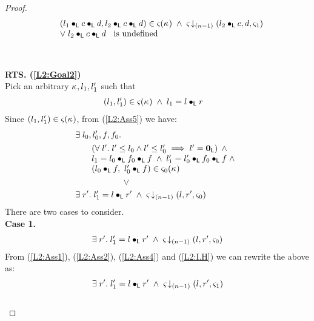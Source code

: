 \begin{lemma}[]
\begin{proof}
%
\begin{align}
	\begin{array}{l l}
		&(l_1 \bullet_{\textsf{L}} c \bullet_{\textsf{L}} d, l_2 \bullet_{\textsf{L}} c \bullet_{\textsf{L}} d) \in \varsigma_{}(\kappa_{})\;\land\;  \varsigma_{} \!\downarrow_{(n-1)} \left(l_2 \bullet_{\textsf{L}} c, d, \varsigma_{1}\right) \\
		& \lor\; l_2 \bullet_{\textsf{L}} c \bullet_{\textsf{L}} d \hspace*{0.2cm}\text{ is undefined}
	\end{array} \label{L2:DismissedGoal4}
\end{align}\\\\
%
%
%
%
%
\noindent\textbf{RTS. (\ref{L2:Goal2})}\\
Pick an arbitrary $\kappa_{}, l_1, l'_1$ such that
\begin{align}
	&(l_1, l'_1) \in \varsigma_{}(\kappa_{}) \;\land\; l_1 = l \bullet_{\textsf{L}} r \label{L2:Ass40}
\end{align}
%
Since $(l_1, l'_1) \in \varsigma_{}(\kappa_{})$, from (\ref{L2:Ass5}) we have:
\begin{align}
&\exsts{l_0, l'_0, f, f_0} \nonumber\\
&  \hspace*{0.5cm}
  \begin{array}{l}
  	\left(\for{l'} l' \leq l_0 \land l' \leq l'_0 \implies l' = \unitL\right)\;\land\\
  	l_1 = l_0 \composeL f_0 \composeL f \;\land\; l'_1 = l'_0 \composeL f_0 \composeL f  \;\land\\
  	(l_0 \composeL f,\ l'_0 \composeL f) \in \amod{0}(\ca{}) 
  \end{array} \nonumber\\
%
	& \hspace*{2cm}\lor  \nonumber\\
	& \exsts{r'} l'_1 = l \composeL r' \;\land\; \extendsAMUpto{\amod}{(n-1)}{l}{r'}{\amod{0}} \nonumber
\end{align}
There are two cases to consider.\\
\textbf{Case 1.} 
%
\[
\begin{array}{l}
	\exists\; r'.\; l'_1 = l \bullet_{\textsf{L}} r' \;\land\; \varsigma_{\!}\downarrow_{(n-1)} \left(l, r', \varsigma_{0}\right)
\end{array}
\]
%
From (\ref{L2:Ass1}), (\ref{L2:Ass2}), (\ref{L2:Ass4}) and (\ref{L2:I.H}) we can rewrite the above as:
%
\begin{equation}
 \exists\; r'.\; l'_1 = l \bullet_{\textsf{L}} r' \;\land\; \varsigma_{} \!\downarrow_{(n-1)} \left(l, r', \varsigma_{1}\right) \label{L2:Case1}
\end{equation}\\


\end{proof}
\end{lemma}
